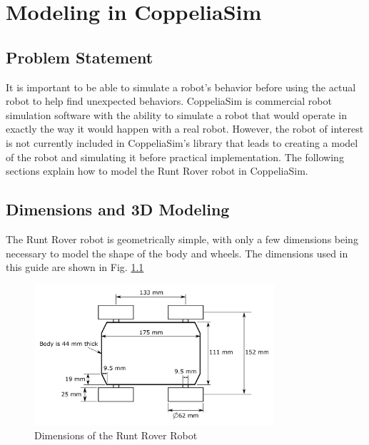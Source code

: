 \chapter{Modeling in CoppeliaSim}
\label{ch:coppSimModeling}

\section{Problem Statement}
It is important to be able to simulate a robot's behavior before using the
actual robot to help find unexpected behaviors. CoppeliaSim is commercial robot
simulation software with the ability to simulate a robot that would operate in
exactly the way it would happen with a real robot. However, the robot of
interest is not currently included in CoppeliaSim's library that leads to
creating a model of the robot and simulating it before practical implementation.
The following sections explain how to model the Runt Rover robot in CoppeliaSim.

\section{Dimensions and 3D Modeling}
The Runt Rover robot is geometrically simple, with only a few dimensions being necessary to model the shape of the body and wheels. The dimensions used in this guide are shown in Fig. \ref{fig:runtRoverDims}

\begin{figure}
    \centering
    \includegraphics[width=3.5in]{figs/img/runtRoverDimensions}
    \caption{Dimensions of the Runt Rover Robot}
    \label{fig:runtRoverDims}
\end{figure}

